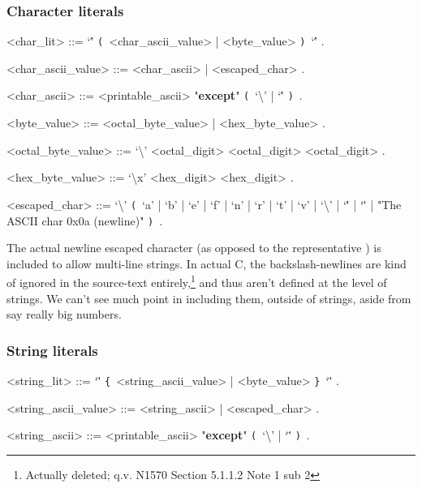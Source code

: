 \documentclass{article}
\def\lrep{\synshortsoff\texttt{\{}\synshorts~}
\def\rrep{\synshortsoff\texttt{\}}\synshorts~}
\def\lgrp{\synshortsoff\texttt{(}\synshorts~}
\def\rgrp{\synshortsoff\texttt{)}\synshorts~}
\begin{document}
\subsubsection*{Character literals}
\begin{grammar}
  <char_lit> ::= `\'' \lgrp <char_ascii_value> | <byte_value> \rgrp `\'' .

  <char_ascii_value> ::= <char_ascii> | <escaped_char> .

  <char_ascii> ::= <printable_ascii> "\textbf{except}" \lgrp `\textbackslash' | `\'' \rgrp .

  <byte_value> ::= <octal_byte_value> | <hex_byte_value> .

  <octal_byte_value> ::= `\textbackslash' <octal_digit> <octal_digit> <octal_digit> .

  <hex_byte_value> ::= `\textbackslash x' <hex_digit> <hex_digit> .

  <escaped_char> ::= `\textbackslash' \lgrp `a' | `b' | `e' | `f' | `n' | `r' |
  `t' | `v' | `\textbackslash' | `\'' | `\"' | "The ASCII char 0x0a (newline)" \rgrp .
\end{grammar}
The actual newline escaped character (as opposed to the representative
) is included to allow multi-line strings. In actual C,
the backslash-newlines are kind of ignored in the source-text
entirely,\footnote{Actually deleted; q.v. N1570 Section 5.1.1.2 Note 1 sub 2}
and thus aren't defined at the level of strings. We can't see much point in
including them, outside of strings, aside from say really big numbers.

\subsubsection*{String literals}
\begin{grammar}
  <string_lit> ::= `\"' \lrep <string_ascii_value> | <byte_value> \rrep `\"' .

  <string_ascii_value> ::= <string_ascii> | <escaped_char> .

  <string_ascii> ::= <printable_ascii> "\textbf{except}" \lgrp `\textbackslash' | `\"' \rgrp .
\end{grammar}
\end{document}
